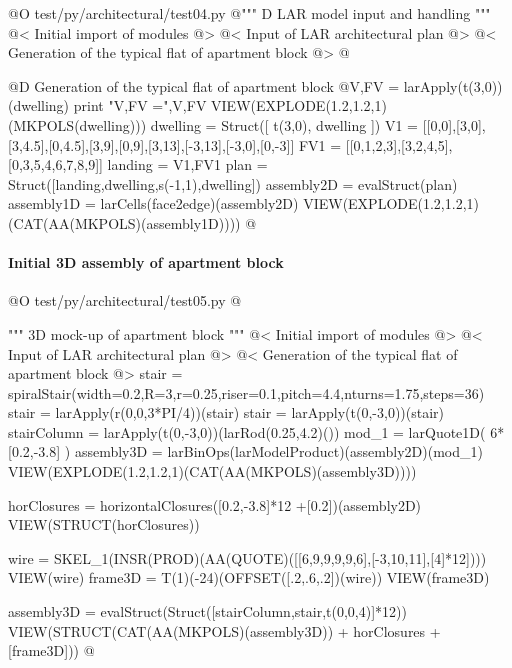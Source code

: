 \documentclass[11pt,oneside]{article}    %
\begin{document}
@O test/py/architectural/test04.py
@{""" D LAR model input and handling """
@< Initial import of modules @>
@< Input of LAR architectural plan @>
@< Generation of the typical flat of apartment block @>
@}

@D Generation of the typical flat of apartment block
@{V,FV = larApply(t(3,0))(dwelling)
print "\n V,FV =",V,FV
VIEW(EXPLODE(1.2,1.2,1)(MKPOLS(dwelling)))
dwelling = Struct([ t(3,0), dwelling ])
V1 = [[0,0],[3,0],[3,4.5],[0,4.5],[3,9],[0,9],[3,13],[-3,13],[-3,0],[0,-3]]
FV1 = [[0,1,2,3],[3,2,4,5],[0,3,5,4,6,7,8,9]]
landing = V1,FV1
plan = Struct([landing,dwelling,s(-1,1),dwelling])
assembly2D = evalStruct(plan)
assembly1D = larCells(face2edge)(assembly2D)
VIEW(EXPLODE(1.2,1.2,1)(CAT(AA(MKPOLS)(assembly1D))))
@}




\paragraph{Initial 3D assembly of apartment block}

@O test/py/architectural/test05.py
@{""" 3D mock-up of apartment block """
@< Initial import of modules @>
@< Input of LAR architectural plan @>
@< Generation of the typical flat of apartment block @>
stair = spiralStair(width=0.2,R=3,r=0.25,riser=0.1,pitch=4.4,nturns=1.75,steps=36)
stair = larApply(r(0,0,3*PI/4))(stair)
stair = larApply(t(0,-3,0))(stair)
stairColumn = larApply(t(0,-3,0))(larRod(0.25,4.2)())
mod_1 = larQuote1D( 6*[0.2,-3.8] )
assembly3D = larBinOps(larModelProduct)(assembly2D)(mod_1)
VIEW(EXPLODE(1.2,1.2,1)(CAT(AA(MKPOLS)(assembly3D))))

horClosures = horizontalClosures([0.2,-3.8]*12 +[0.2])(assembly2D)
VIEW(STRUCT(horClosures))

wire = SKEL_1(INSR(PROD)(AA(QUOTE)([[6,9,9,9,9,6],[-3,10,11],[4]*12])))
VIEW(wire)
frame3D = T(1)(-24)(OFFSET([.2,.6,.2])(wire))
VIEW(frame3D)

assembly3D = evalStruct(Struct([stairColumn,stair,t(0,0,4)]*12))
VIEW(STRUCT(CAT(AA(MKPOLS)(assembly3D)) + horClosures + [frame3D]))
@}
\end{document}
